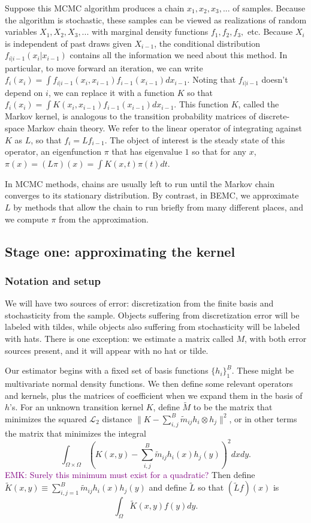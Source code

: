 \documentclass{article}
\newcommand\EMK[1]{\textcolor{purple}{EMK: #1}}
\begin{document}
Suppose this MCMC algorithm produces a chain $ x_1, x_2, x_3, ...$ of samples. Because the algorithm is stochastic, these samples can be viewed as realizations of random variables $X_1, X_2, X_3, ...$ with marginal density functions $f_1, f_2, f_3, $ etc. Because $X_i$ is independent of past draws given $X_{i-1}$, the conditional distribution $f_{i|i-1}(x_i|x_{i-1})$ contains all the information we need about this method. In particular, to move forward an iteration, we can write $f_i(x_i) = \int f_{i|i-1}(x_{i},x_{i-1})f_{i-1}(x_{i-1})dx_{i-1}$. Noting that $f_{i|i-1}$ doesn't depend on $i$, we can replace it with a function $K$ so that $f_i(x_i) = \int K(x_i, x_{i-1})f_{i-1}(x_{i-1})dx_{i-1}$. This function $K$, called the Markov kernel, is analogous to the transition probability matrices of discrete-space Markov chain theory. We refer to the linear operator of integrating against $K$ as $L$, so that $f_{i} = Lf_{i-1}$. The object of interest is the steady state of this operator, an eigenfunction $\pi$ that has eigenvalue $1$ so that for any $x$, $\pi(x) = (L\pi)(x) = \int K(x, t)\pi(t)dt$. 

In MCMC methods, chains are usually left to run until the Markov chain converges to its stationary distribution. By contrast, in BEMC, we approximate $L$ by methods that allow the chain to run briefly from many different places, and we compute $\pi$ from the approximation. 

\subsection{Stage one: approximating the kernel}
\label{sec:BEMC}

\subsubsection{Notation and setup}

We will have two sources of error: discretization from the finite basis and stochasticity from the sample. Objects suffering from discretization error will be labeled with tildes, while objects also suffering from stochasticity will be labeled with hats. There is one exception: we estimate a matrix called $M$, with both error sources present, and it will appear with no hat or tilde.

Our estimator begins with a fixed set of basis functions $\{h_i\}_1^B$. These might be multivariate normal density functions. We then define some relevant operators and kernels, plus the matrices of coefficient when we expand them in the basis of $h$'s. For an unknown transition kernel $K$, define $\tilde{M}$ to be the matrix that minimizes the squared $\mathcal{L}_2$ distance $\|K - \sum_{i,j}^B\tilde{m}_{ij} h_i \otimes h_j\|^2$, or in other terms the matrix that minimizes the integral $$\int_{\Omega\times\Omega}(K(x,y) - \sum_{i,j}^B\tilde{m}_{ij} h_i(x)h_j(y))^2dx dy .$$ \EMK{Surely this minimum must exist for a quadratic?} Then define $\tilde{K}(x,y) \equiv \sum_{i,j=1}^B \tilde{m}_{ij} h_i(x)h_j(y)$ and define $\tilde{L}$ so that $(\tilde{L}f)(x)$ is $$\int_{\Omega}\tilde{K}(x,y)f(y)dy.$$
\end{document}
